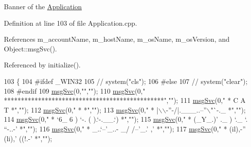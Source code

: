 Banner of the \hyperlink{classApplication}{Application} 

Definition at line 103 of file Application.\+cpp.



References m\+\_\+account\+Name, m\+\_\+host\+Name, m\+\_\+os\+Name, m\+\_\+os\+Version, and Object\+::msg\+Svc().



Referenced by initialize().


\begin{DoxyCode}
103                            \{
104 \textcolor{preprocessor}{#ifdef \_WIN32
}
105   \textcolor{comment}{//  system("cls");}
106 \textcolor{preprocessor}{#else
}
107   \textcolor{comment}{//  system("clear");}
108 \textcolor{preprocessor}{#endif
}
109   \hyperlink{classObject_a3f9d5537ebce0c0f2bf6ae4d92426f3c}{msgSvc}(0,\textcolor{stringliteral}{""},\textcolor{stringliteral}{""});
110   \hyperlink{classObject_a3f9d5537ebce0c0f2bf6ae4d92426f3c}{msgSvc}(0,\textcolor{stringliteral}{"                          ***********************************************"},\textcolor{stringliteral}{""});
111   \hyperlink{classObject_a3f9d5537ebce0c0f2bf6ae4d92426f3c}{msgSvc}(0,\textcolor{stringliteral}{"                          *               C      A      T               *"},\textcolor{stringliteral}{""});
112   \hyperlink{classObject_a3f9d5537ebce0c0f2bf6ae4d92426f3c}{msgSvc}(0,\textcolor{stringliteral}{"                          *                                             *"},\textcolor{stringliteral}{""});
113   \hyperlink{classObject_a3f9d5537ebce0c0f2bf6ae4d92426f3c}{msgSvc}(0,\textcolor{stringliteral}{"                          *          |\(\backslash\)\(\backslash\)-''-/|.\_\_\_..--''\(\backslash\)"`-.\_            *"},\textcolor{stringliteral}{""});
114   \hyperlink{classObject_a3f9d5537ebce0c0f2bf6ae4d92426f3c}{msgSvc}(0,\textcolor{stringliteral}{"                          *          `6\_ 6  )   `-.  (     ).`-.\_\_.`)   *"},\textcolor{stringliteral}{""});
115   \hyperlink{classObject_a3f9d5537ebce0c0f2bf6ae4d92426f3c}{msgSvc}(0,\textcolor{stringliteral}{"                          *          (\_Y\_.)'  .\_   )  `.\_ `. ``-..-'    *"},\textcolor{stringliteral}{""});
116   \hyperlink{classObject_a3f9d5537ebce0c0f2bf6ae4d92426f3c}{msgSvc}(0,\textcolor{stringliteral}{"                          *         \_..`--'\_..-  \_/ /--'\_.' ,'          *"},\textcolor{stringliteral}{""});
117   \hyperlink{classObject_a3f9d5537ebce0c0f2bf6ae4d92426f3c}{msgSvc}(0,\textcolor{stringliteral}{"                          *     (il),-''  (li),' ((!.-'                 *"},\textcolor{stringliteral}{""});

\end{DoxyCode}
